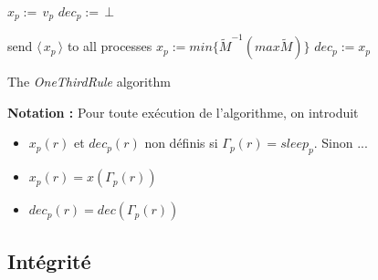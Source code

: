 \documentclass{article}
\begin{document}
\begin{algorithm}[htb]
\begin{distribalgo}[1]
\BLANK {}
  \STATE $x_p :=\, v_p$ 
  \STATE $dec_p :=\, \bot$ 

\ENDINDENT \BLANK

    \STATE send $\langle\, x_p\, \rangle$ to all processes
  \ENDINDENT
  \BLANK
	  \STATE $x_p := min \{\widetilde{M}^{-1} (max \widetilde{M})\}$ 
		  \STATE $dec_p := x_p$ 
        \ENDIF
      \ENDIF
  \ENDINDENT
\ENDINDENT \BLANK


\caption{The {\em OneThirdRule} algorithm} \label{algo:R}
\end{distribalgo}

\end{algorithm}

\textbf{Notation :} Pour toute exécution de l'algorithme, on introduit
\begin{itemize}

	\item $x_p(r)$ et $dec_p(r)$ non définis si $\Gamma_p(r) = sleep_p$. Sinon ...
	\item $x_p(r) = x(\Gamma_p(r))$
	\item $dec_p(r) = dec(\Gamma_p(r))$

\end{itemize}

\subsection{Intégrité}
\end{document}
